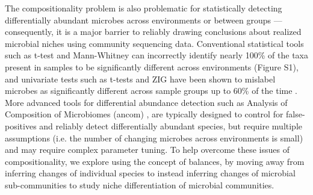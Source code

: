 The compositionality problem is also problematic for statistically detecting differentially abundant microbes across environments or between groups — consequently, it is a major barrier to reliably drawing conclusions about realized microbial niches using community sequencing data. Conventional statistical tools such as t-test and Mann-Whitney can incorrectly identify nearly 100\% of the taxa present in samples to be significantly different across environments (Figure S1), and univariate tests such as t-tests and ZIG \cite{metagenomeSeq} have been shown to mislabel microbes as significantly different across sample groups up to 60\% of the time \cite{ancom}. More advanced tools for differential abundance detection such as Analysis of Composition of Microbiomes (\gls{ancom}) \cite{ancom}, are typically designed to control for false-positives and reliably detect differentially abundant species, but require multiple assumptions (i.e. the number of changing microbes across environments is small) and may require complex parameter tuning. To help overcome these issues of compositionality, we explore using the concept of balances, by moving away from inferring changes of individual species to instead inferring changes of microbial sub-communities to study niche differentiation of microbial communities.\par
